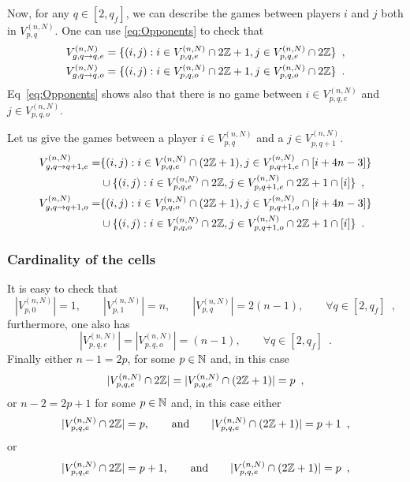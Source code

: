 Now, for any $q\in [2,q_f]$, we can describe the games between players $i$ and $j$ both in $V_{p,q}^{(n,N)}$. One can use \eqref{eq:Opponents} to check that
\begin{align}
 \notag V_{g,q\to q,e}^{(n,N)}&=\{(i,j) : i\in V_{p,q,e}^{(n,N)}\cap 2\mathbb{Z}+1, j\in V_{p,q,e}^{(n,N)}\cap 2\mathbb{Z}\}\enspace,\\
\label{Def:Vqtoq}  V_{g,q\to q,o}^{(n,N)}&=\{(i,j) : i\in V_{p,q,o}^{(n,N)}\cap 2\mathbb{Z}+1, j\in V_{p,q,o}^{(n,N)}\cap 2\mathbb{Z}\}\enspace.
\end{align}
Eq~\eqref{eq:Opponents} shows also that there is no game between $i\in V_{p, q,e}^{(n,N)}$ and $j\in V_{p,q,o}^{(n,N)}$. 

Let us give the games between a player $i\in V_{p,q}^{(n,N)}$ and a $j\in V_{p,q+1}^{(n,N)}$.
\begin{align*}
V_{g,q\to q+1,e}^{(n,N)}=&\{(i,j) : i\in V_{p,q,e}^{(n,N)}\cap(2\mathbb{Z}+1),j\in V_{p,q+1,e}^{(n,N)}\cap [i+4n-3]\}\\
&\cup\{(i,j) : i\in V_{p,q,e}^{(n,N)}\cap 2\mathbb{Z},j\in V_{p,q+1,e}^{(n,N)}\cap 2\mathbb{Z}+1\cap [i]\}\enspace,\\
V_{g,q\to q+1,o}^{(n,N)}=&\{(i,j) : i\in V_{p,q,o}^{(n,N)}\cap(2\mathbb{Z}+1),j\in V_{p,q+1,o}^{(n,N)}\cap [i+4n-3]\}\\
&\cup\{(i,j) : i\in V_{p,q,o}^{(n,N)}\cap 2\mathbb{Z},j\in V_{p,q+1,o}^{(n,N)}\cap 2\mathbb{Z}+1\cap [i]\}\enspace.
\end{align*}

\subsubsection{Cardinality of the cells}
It is easy to check that 
\[
|V_{p,0}^{(n,N)}|=1, \qquad |V_{p,1}^{(n,N)}|=n,\qquad |V_{p,q}^{(n,N)}|=2(n-1),\qquad\forall q\in[2,q_f]\enspace,
\]
furthermore, one also has
\[
|V_{p,q,e}^{(n,N)}|=|V_{p,q,o}^{(n,N)}|=(n-1),\qquad \forall q\in [2,q_f]\enspace.
\]
Finally either $n-1=2p$, for some $p\in \mathbb{N}$ and, in this case 
\[
|V_{p,q,e}^{(n,N)}\cap 2\mathbb{Z}|=|V_{p,q,e}^{(n,N)}\cap (2\mathbb{Z}+1)|=p\enspace,
\]
or $n-2=2p+1$ for some $p\in \mathbb{N}$ and, in this case either 
\[
|V_{p,q,e}^{(n,N)}\cap 2\mathbb{Z}|=p,\qquad\text{and}\qquad |V_{p,q,e}^{(n,N)}\cap (2\mathbb{Z}+1)|=p+1\enspace,
\]
or 
\[
|V_{p,q,e}^{(n,N)}\cap 2\mathbb{Z}|=p+1,\qquad\text{and}\qquad |V_{p,q,e}^{(n,N)}\cap (2\mathbb{Z}+1)|=p\enspace,
\]


